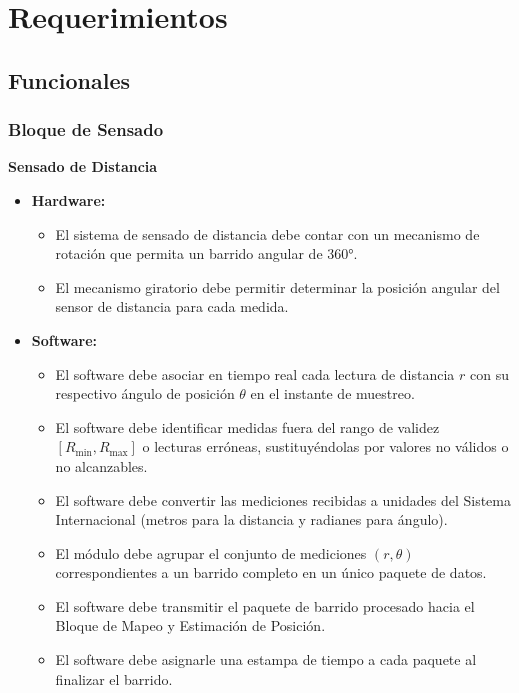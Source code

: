 \section{Requerimientos}

\subsection{Funcionales}

\subsubsection{Bloque de Sensado}
\noindent\textbf{Sensado de Distancia}
\begin{itemize}
    \item \textbf{Hardware:}
    \begin{itemize}
        \item El sistema de sensado de distancia debe contar con un mecanismo de rotación que permita un barrido angular de 360°.
        \item El mecanismo giratorio debe permitir determinar la posición angular del sensor de distancia para cada medida.
    \end{itemize}
    \item \textbf{Software:}
    \begin{itemize}
        \item El software debe asociar en tiempo real cada lectura de distancia $r$ con su respectivo ángulo de posición $\theta$ en el instante de muestreo.
        \item El software debe identificar medidas fuera del rango de validez $[R_{\text{min}}, R_{\text{max}}]$ o lecturas erróneas, sustituyéndolas por valores no válidos o no alcanzables.
        \item El software debe convertir las mediciones recibidas a unidades del Sistema Internacional (metros para la distancia y radianes para ángulo).
        \item El módulo debe agrupar el conjunto de mediciones $(r, \theta)$ correspondientes a un barrido completo en un único paquete de datos.
        \item El software debe transmitir el paquete de barrido procesado hacia el Bloque de Mapeo y Estimación de Posición.
        \item El software debe asignarle una estampa de tiempo a cada paquete al finalizar el barrido.
    \end{itemize}
\end{itemize}

